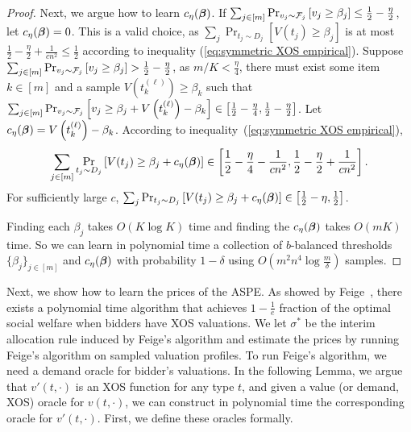 \begin{proof}
 		Next, we argue how to learn $c_\eta(\boldsymbol{\beta})$. If $\sum_{j\in[m]} \Pr_{v_j\sim{\mathcal{F}}_j}\left[v_j\geq \beta_j \right] \leq \frac{1}{2}-\frac{\eta}{2}$, let $c_{\eta}(\boldsymbol{\beta})=0$. 
		This is a valid choice, as $\sum_{j} \Pr_{t_{j}\sim D_j}\left[V(t_j)\geq \beta_j\right]$ is at most $\frac{1}{2}-\frac{\eta}{2}+\frac{1}{cn^2}\leq \frac{1}{2}$ %
		 according to inequality (\ref{eq:symmetric XOS empirical}). 
		 Suppose $\sum_{j\in[m]} \Pr_{v_j\sim{\mathcal{F}}_j}\left[v_j\geq \beta_j \right] > \frac{1}{2}-\frac{\eta}{2}$, as $m/K< \frac{\eta}{4}$, there must exist some item $k\in[m]$ and a sample $V\left(t_k^{(\ell)}\right)\geq \beta_k$ such that $\sum_{j\in[m]} \Pr_{v_j\sim{\mathcal{F}}_j}\left[v_j\geq \beta_j+V\left(t_k^{(\ell)}\right)- \beta_k \right]\in \left[\frac{1}{2}-\frac{\eta}{4},\frac{1}{2}-\frac{\eta}{2}\right]$.
		  Let $c_\eta(\boldsymbol{\beta})= V\left(t_k^{(\ell)}\right)- \beta_k$.
		   According to inequality~(\ref{eq:symmetric XOS empirical}),  $$\sum_{j\in[m]} \Pr_{t_{j}\sim D_j}\left[V(t_j)\geq \beta_j+c_\eta(\boldsymbol{\beta}) \right]\in  \left[\frac{1}{2}-\frac{\eta}{4}-\frac{1}{cn^2},\frac{1}{2}-\frac{\eta}{2}+\frac{1}{cn^2}\right].$$
		    For sufficiently large $c$, $\sum_{j} \Pr_{t_{j}\sim D_j}\left[V(t_j)\geq \beta_j+c_\eta(\boldsymbol{\beta}) \right]\in  \left[\frac{1}{2}-\eta,\frac{1}{2}\right]$. 
 		
 		Finding each $\beta_j$ takes $O(K\log K)$ time and finding the $c_\eta(\boldsymbol{\beta})$ takes $O(mK)$ time. So we can learn in polynomial time a collection of $b$-balanced thresholds $\{\beta_j\}_{j\in[m]}$ and $c_\eta(\boldsymbol{\beta})$ with probability $1-\delta$ using $O\left(m^2n^4\log \frac{m}{\delta}\right)$ samples.
 			\end{proof}
 			
 		Next, we show how to learn the prices of the ASPE. As showed by Feige~\cite{Feige09}, there exists a polynomial time algorithm that achieves $1-\frac{1}{e}$ fraction of the optimal social welfare when bidders have XOS valuations. We let $\sigma^*$ be the interim allocation rule induced by Feige's algorithm and estimate the prices by running Feige's algorithm on sampled valuation profiles.	To run Feige's algorithm, we need a demand oracle for bidder's valuations. In the following Lemma, we argue that $v'(t,\cdot)$ is an XOS function for any type $t$, and given a value (or demand, XOS) oracle for $v(t,\cdot)$, we can construct in polynomial time the corresponding oracle for $v'(t,\cdot)$. First, we define these oracles formally.
 
